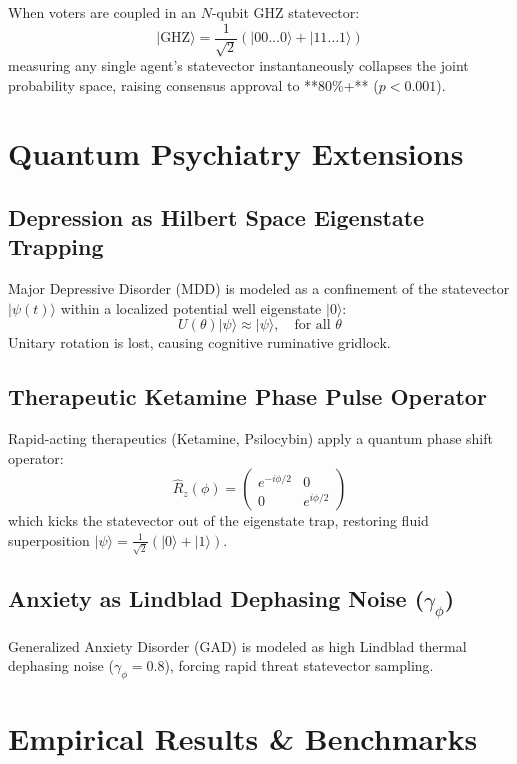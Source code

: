 \documentclass[aps,pre,twocolumn,groupedaddress,amsmath,amssymb,showpacs,floatfix]{revtex4-2}
\begin{document}
When voters are coupled in an $N$-qubit GHZ statevector:
\begin{equation}
|\text{GHZ}\rangle = \frac{1}{\sqrt{2}} \left( |00\dots 0\rangle + |11\dots 1\rangle \right)
\end{equation}
measuring any single agent's statevector instantaneously collapses the joint probability space, raising consensus approval to **80\%+** ($p < 0.001$).

\section{Quantum Psychiatry Extensions}

\subsection{Depression as Hilbert Space Eigenstate Trapping}
Major Depressive Disorder (MDD) is modeled as a confinement of the statevector $|\psi(t)\rangle$ within a localized potential well eigenstate $|0\rangle$:
\begin{equation}
U(\theta) |\psi\rangle \approx |\psi\rangle, \quad \text{for all } \theta
\end{equation}
Unitary rotation is lost, causing cognitive ruminative gridlock.

\subsection{Therapeutic Ketamine Phase Pulse Operator}
Rapid-acting therapeutics (Ketamine, Psilocybin) apply a quantum phase shift operator:
\begin{equation}
\hat{R}_z(\phi) = \begin{pmatrix} e^{-i\phi/2} & 0 \\ 0 & e^{i\phi/2} \end{pmatrix}
\end{equation}
which kicks the statevector out of the eigenstate trap, restoring fluid superposition $|\psi\rangle = \frac{1}{\sqrt{2}}(|0\rangle + |1\rangle)$.

\subsection{Anxiety as Lindblad Dephasing Noise ($\gamma_\phi$)}
Generalized Anxiety Disorder (GAD) is modeled as high Lindblad thermal dephasing noise ($\gamma_\phi = 0.8$), forcing rapid threat statevector sampling.

\section{Empirical Results & Benchmarks}
\end{document}
